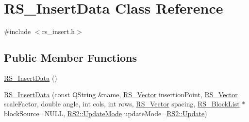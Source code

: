 \hypertarget{classRS__InsertData}{\section{R\-S\-\_\-\-Insert\-Data Class Reference}
\label{classRS__InsertData}
}


{\ttfamily \#include $<$rs\-\_\-insert.\-h$>$}

\subsection*{Public Member Functions}
\begin{DoxyCompactItemize}
\item 
\hyperlink{classRS__InsertData_a0e7238a8cf3829e2001bd3576a31e4be}{R\-S\-\_\-\-Insert\-Data} ()
\item 
\hyperlink{classRS__InsertData_a3ff5ae7c7d68d67124af1bf2aa7044d0}{R\-S\-\_\-\-Insert\-Data} (const Q\-String \&name, \hyperlink{classRS__Vector}{R\-S\-\_\-\-Vector} insertion\-Point, \hyperlink{classRS__Vector}{R\-S\-\_\-\-Vector} scale\-Factor, double angle, int cols, int rows, \hyperlink{classRS__Vector}{R\-S\-\_\-\-Vector} spacing, \hyperlink{classRS__BlockList}{R\-S\-\_\-\-Block\-List} $\ast$block\-Source=N\-U\-L\-L, \hyperlink{classRS2_ab05150052f314f729c76afff34f89bc5}{R\-S2\-::\-Update\-Mode} update\-Mode=\hyperlink{classRS2_ab05150052f314f729c76afff34f89bc5a83180c94271651d6a709844b1453bf58}{R\-S2\-::\-Update})
\end{DoxyCompactItemize}
